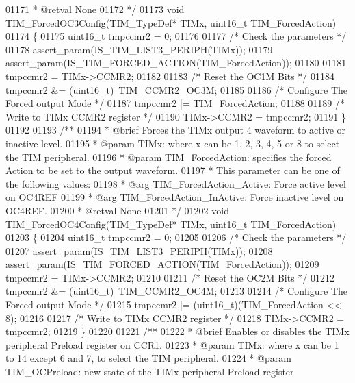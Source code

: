 \begin{DoxyCode}
01171 \textcolor{comment}{  * @retval None}
01172 \textcolor{comment}{  */}
01173 \textcolor{keywordtype}{void} TIM_ForcedOC3Config(TIM\_TypeDef* TIMx, uint16\_t TIM\_ForcedAction)
01174 \{
01175   uint16\_t tmpccmr2 = 0;
01176 
01177   \textcolor{comment}{/* Check the parameters */}
01178   assert_param(IS\_TIM\_LIST3\_PERIPH(TIMx));
01179   assert_param(IS\_TIM\_FORCED\_ACTION(TIM\_ForcedAction));
01180 
01181   tmpccmr2 = TIMx->CCMR2;
01182 
01183   \textcolor{comment}{/* Reset the OC1M Bits */}
01184   tmpccmr2 &= (uint16\_t)~TIM_CCMR2_OC3M;
01185 
01186   \textcolor{comment}{/* Configure The Forced output Mode */}
01187   tmpccmr2 |= TIM\_ForcedAction;
01188 
01189   \textcolor{comment}{/* Write to TIMx CCMR2 register */}
01190   TIMx->CCMR2 = tmpccmr2;
01191 \}
01192 
01193 \textcolor{comment}{/**}
01194 \textcolor{comment}{  * @brief  Forces the TIMx output 4 waveform to active or inactive level.}
01195 \textcolor{comment}{  * @param  TIMx: where x can be  1, 2, 3, 4, 5 or 8 to select the TIM peripheral.}
01196 \textcolor{comment}{  * @param  TIM\_ForcedAction: specifies the forced Action to be set to the output waveform.}
01197 \textcolor{comment}{  *          This parameter can be one of the following values:}
01198 \textcolor{comment}{  *            @arg TIM\_ForcedAction\_Active: Force active level on OC4REF}
01199 \textcolor{comment}{  *            @arg TIM\_ForcedAction\_InActive: Force inactive level on OC4REF.}
01200 \textcolor{comment}{  * @retval None}
01201 \textcolor{comment}{  */}
01202 \textcolor{keywordtype}{void} TIM_ForcedOC4Config(TIM\_TypeDef* TIMx, uint16\_t TIM\_ForcedAction)
01203 \{
01204   uint16\_t tmpccmr2 = 0;
01205 
01206   \textcolor{comment}{/* Check the parameters */}
01207   assert_param(IS\_TIM\_LIST3\_PERIPH(TIMx));
01208   assert_param(IS\_TIM\_FORCED\_ACTION(TIM\_ForcedAction));
01209   tmpccmr2 = TIMx->CCMR2;
01210 
01211   \textcolor{comment}{/* Reset the OC2M Bits */}
01212   tmpccmr2 &= (uint16\_t)~TIM_CCMR2_OC4M;
01213 
01214   \textcolor{comment}{/* Configure The Forced output Mode */}
01215   tmpccmr2 |= (uint16\_t)(TIM\_ForcedAction << 8);
01216 
01217   \textcolor{comment}{/* Write to TIMx CCMR2 register */}
01218   TIMx->CCMR2 = tmpccmr2;
01219 \}
01220 
01221 \textcolor{comment}{/**}
01222 \textcolor{comment}{  * @brief  Enables or disables the TIMx peripheral Preload register on CCR1.}
01223 \textcolor{comment}{  * @param  TIMx: where x can be 1 to 14 except 6 and 7, to select the TIM peripheral.}
01224 \textcolor{comment}{  * @param  TIM\_OCPreload: new state of the TIMx peripheral Preload register}

\end{DoxyCode}

